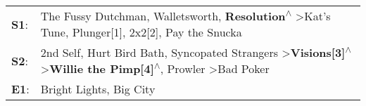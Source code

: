 \begin{supertabular}{p{0.03\textwidth}p{0.92\textwidth}}
 \textbf{S1}:  &                                                 The Fussy Dutchman\textsuperscript{}, \enspace Walletsworth\textsuperscript{}, \enspace \textbf{Resolution\textsuperscript{$\wedge$}} \textgreater \enspace Kat's Tune\textsuperscript{}, \enspace Plunger[1]\textsuperscript{}, \enspace 2x2[2]\textsuperscript{}, \enspace Pay the Snucka\textsuperscript{}  \enspace  \\
 \textbf{S2}:  &  2nd Self\textsuperscript{}, \enspace Hurt Bird Bath\textsuperscript{}, \enspace Syncopated Strangers\textsuperscript{} \textgreater \enspace \textbf{Visions[3]\textsuperscript{$\wedge$}} \textgreater \enspace \textbf{Willie the Pimp[4]\textsuperscript{$\wedge$}}, \enspace Prowler\textsuperscript{} \textgreater \enspace Bad Poker\textsuperscript{}  \enspace  \\
 \textbf{E1}:  &                                                                                                                                                                                                                                                                                                                     Bright Lights, Big City\textsuperscript{}  \enspace  \\
\end{supertabular}
